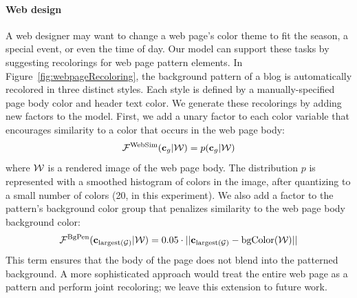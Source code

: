 \paragraph{Web design}
A web designer may want to change a web page's color theme to fit the season, a special event, or even the time of day. Our model can support these tasks by suggesting recolorings for web page pattern elements. In Figure~\ref{fig:webpageRecoloring}, the background pattern of a blog is automatically recolored in three distinct styles. Each style is defined by a manually-specified page body color and header text color. We generate these recolorings by adding new factors to the model. First, we add a unary factor to each color variable that encourages similarity to a color that occurs in the web page body:
\begin{equation*}
\mathcal{F}^\textrm{WebSim}(\mathbf{c}_g | \mathcal{W}) = p(\mathbf{c}_g | \mathcal{W})
\end{equation*}
where $\mathcal{W}$ is a rendered image of the web page body. The distribution $p$ is represented with a smoothed histogram of colors in the image, after quantizing to a small number of colors (20, in this experiment).
We also add a factor to the pattern's background color group that penalizes similarity to the web page body background color:
\begin{equation*}
\mathcal{F}^\textrm{BgPen}(\mathbf{c}_{\textrm{largest}(\mathcal{G})} | \mathcal{W}) = 0.05 \cdot || \mathbf{c}_{\textrm{largest}(\mathcal{G})} - \textrm{bgColor}(\mathcal{W}) ||
\end{equation*}
This term ensures that the body of the page does not blend into the patterned background. A more sophisticated approach would treat the entire web page as a pattern and perform joint recoloring; we leave this extension to future work.


